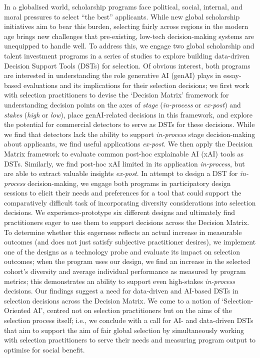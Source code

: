 In a globalised world, scholarship programs face political, social, internal, and moral pressures to select ``the best'' applicants. While new global scholarship initiatives aim to bear this burden, selecting fairly across regions in the modern age brings new challenges that pre-existing, low-tech decision-making systems are unequipped to handle well. To address this, we engage two global scholarship and talent investment programs in a series of studies to explore building data-driven Decision Support Tools (DSTs) for selection. Of obvious interest, both programs are interested in understanding the role generative AI (genAI) plays in essay-based evaluations and its implications for their selection decisions; we first work with selection practitioners to devise the `Decision Matrix' framework for understanding decision points on the axes of \emph{stage} (\emph{in-process} or \emph{ex-post}) and \emph{stakes} (\emph{high} or \emph{low}), place genAI-related decisions in this framework, and explore the potential for commercial detectors to serve as DSTs for these decisions. While we find that detectors lack the ability to support \emph{in-process} stage decision-making about applicants, we find useful applications \emph{ex-post}. We then apply the Decision Matrix framework to evaluate common post-hoc explainable AI (xAI) tools as DSTs. Similarly, we find post-hoc xAI limited in its application \emph{in-process}, but are able to extract valuable insights \emph{ex-post}. In attempt to design a DST for \emph{in-process} decision-making, we engage both programs in participatory design sessions to elicit their needs and preferences for a tool that could support the comparatively difficult task of incorporating diversity considerations into selection decisions. We experience-prototype six different designs and ultimately find practitioners eager to use them to support decisions across the Decision Matrix. To determine whether this eagerness reflects an actual increase in measurable outcomes (and does not just satisfy subjective practitioner desires), we implement one of the designs as a technology probe and evaluate its impact on selection outcomes; when the program uses our design, we find an increase in the selected cohort's diversity and average individual performance as measured by program metrics; this demonstrates an ability to support even high-stakes \emph{in-process} decisions. Our findings suggest a need for data-driven and AI-based DSTs in selection decisions across the Decision Matrix. We come to a notion of `Selection-Oriented AI', centred not on selection practitioners but on the aims of the selection process itself; i.e., we conclude with a call for AI- and data-driven DSTs that aim to support the aim of fair global selection by simultaneously working with selection practitioners to serve their needs and measuring program output to optimise for social benefit. %